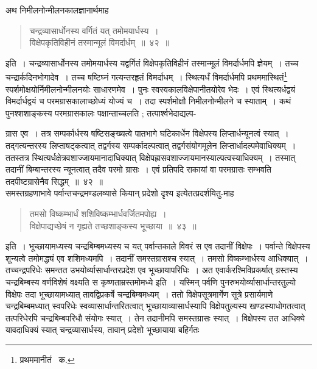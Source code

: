 \documentclass[11pt, openany]{book}
\begin{document}
\indent अथ निमीलनोन्मीलनकालज्ञानार्थमाह\textendash 

\begin{quote}
{\ab चन्द्रव्यासार्धोनस्य वर्गितं यत् तमोमयार्धस्य~।\\
	विक्षेपकृतिविहीनं तस्मान्मूलं विमर्दार्धम्~॥~४२~॥} 
\end{quote}

\indent इति~। चन्द्रव्यासार्धोनस्य तमोमयार्धस्य यद्वर्गितं विक्षेपकृतिविहीनं तस्मान्मूलं विमर्दार्धमपि ज्ञेयम्~। तच्च चन्द्रार्कदिनभोगादेव~।
तच्च षष्टिघ्नं गत्यन्तरहृतं विमर्दाधम्~। स्थित्यर्धं विमर्दार्धमपि प्रथममास्थितं\renewcommand{\thefootnote}{२}\footnote{प्रथममानीतं \textendash\ क.}  स्पर्शमोक्षयोर्निमीलनोन्मीलनयोः साधारणमेव~। पुनः स्वस्वकालविक्षेपानीतयोरेव भेदः~। एवं स्थित्यर्धद्वयं विमर्दार्धद्वयं च परमग्रासकालाच्छोध्यं योज्यं च~। तदा स्पर्शमोक्षौ निमीलनोन्मीलने च स्याताम्~। कथं पुनश्शशाङ्कस्य परमग्रासकालः पक्षान्ताच्चलति ; तत्पार्श्वभेदाद्यल्प- 

\newpage 
\noindent ग्रास एव~। तत्र सम्पर्कार्धस्य षष्टिसङ्ख्यत्वे पातभागे घटिकार्धेन विक्षेपस्य लिप्तार्धन्यूनत्वं स्यात्~। तद्गत्यन्तरस्य लिप्ताषट्कत्वात् तद्वर्गस्य सम्पर्कादल्पत्वात् तद्वर्गसंयोगमूलेन लिप्तार्धादल्पमेवाधिक्यम्~। ततस्तत्र स्थित्यर्धक्षेत्रवशाज्जायमानादाधिक्यात् विक्षेपह्रासवशाज्जायमानस्याल्पत्वस्याधिक्यम्~। तस्मात् तदानीं बिम्बान्तरस्य न्यूनत्वात् तदैव परमो ग्रासः~। एवं प्रतिपदि राकायां वा परमग्रासः सम्भवति तदपीष्टग्रासेनैव सिद्धम्~॥~४२~॥ \\

\indent समस्तग्रहणाभावे पर्वान्तचन्द्रमण्डलव्यासे कियान् प्रदेशो दृश्य इत्येतत्प्रदर्शयितु-माह\textendash  
\begin{quote}
{\ab तमसो विष्कम्भार्धं शशिविष्कम्भार्धवर्जितमपोह्य~।\\
	विक्षेपाद्यच्छेषं न गृह्यते तच्छशाङ्कस्य भूच्छाया~॥~४३~॥}
\end{quote}

\indent इति~। भूच्छायामध्यस्य चन्द्रबिम्बमध्यस्य च यत् पर्वान्तकाले विवरं स एव तदानीं विक्षेपः~। पर्वान्ते विक्षेपस्य शून्यत्वे तमोमद्ध्यं
एव शशिमध्यमपि~। तदानीं समस्तग्रासश्च स्यात्~। तमसो विष्कम्भार्धस्य आधिक्यात्~। तच्चन्द्रपरिधेः समन्तत उभयोर्व्यासार्धान्तरप्रदेश एव
भूच्छायापरिधिः~। अत एवार्करश्मिविप्रकर्षात् ग्रस्तस्य चन्द्रबिम्बस्य वर्णविशेषं वक्ष्यति {\qt स कृष्णताम्रस्तमोमध्ये} इति~। यस्मिन् पर्वणि पुनरुभयोर्व्यासार्धान्तरतुल्यो विक्षेपः तदा भूच्छायामध्यात् तावद्विप्रकर्षे चन्द्रबिम्बमध्यम्~। ततो विक्षेपसूत्रमार्गेण सूत्रे प्रसार्यमाणे
चन्द्रबिम्बमध्यात् स्वपरिधेः स्वव्यासार्धान्तरितत्वात् भूच्छायाव्यासार्धस्यापि विक्षेपतुल्यस्य खण्डस्याधोगतत्वात् तत्परिधेरपि चन्द्रबिम्बपरिधौ संयोगः स्यात्~। तेन तदानीमपि समस्तग्रासः स्यात्~। विक्षेपस्य तत आधिक्ये यावदाधिक्यं स्यात् चन्द्रव्यासार्धस्य, तावान् प्रदेशो भूच्छायाया
बहिर्गतः
\end{document}
